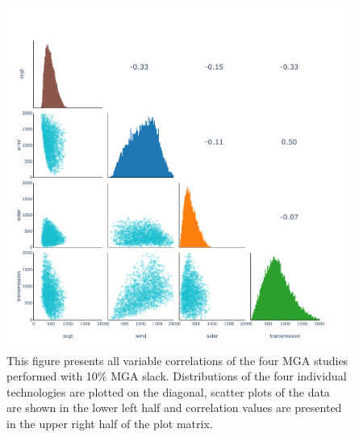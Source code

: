 \begin{figure}[h]\center
	\includegraphics[width=1\textwidth,trim={0 0cm 0 0cm},clip]{./Images/corelation_4D}
	\caption{This figure presents all variable correlations of the four MGA studies performed with 10\% MGA slack. Distributions of the four individual technologies are plotted on the diagonal, scatter plots of the data are shown in the lower left half and correlation values are presented in the upper right half of the plot matrix.}
	\label{fig:corelation}
\end{figure}


